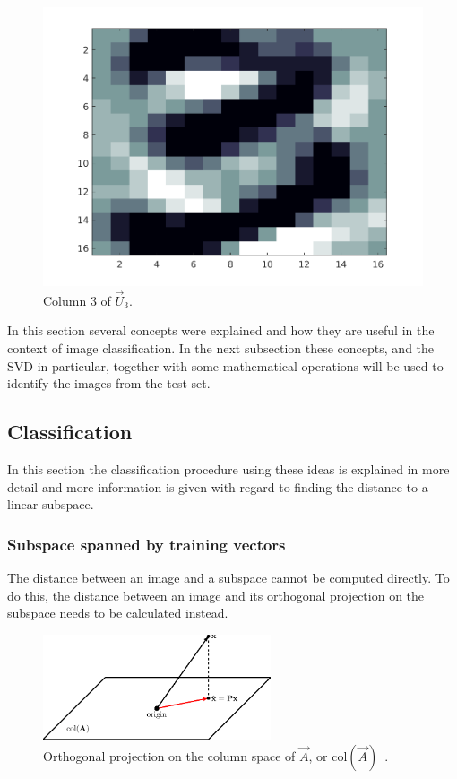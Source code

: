 \begin{figure}[H]
\begin{minipage}{0.3\textwidth}
        \includegraphics[width = \textwidth]{images/svd/U3.png}
        \caption{Column 3 of \(\vec{U}_3\).}\label{fig:svd_u3}
    \end{minipage}
\end{figure}

In this section several concepts were explained and how they are useful in the context of image classification.
In the next subsection these concepts, and the SVD in particular, together with some mathematical operations will be used to identify the images from the test set.

\subsection{Classification}
In this section the classification procedure using these ideas is explained in more detail and more information is given with regard to finding the distance to a linear subspace.

\subsubsection{Subspace spanned by training vectors}
The distance between an image and a subspace cannot be computed directly.
To do this, the distance between an image and its orthogonal projection on the subspace needs to be calculated instead.

\begin{figure}[H]
    \centering
    \includegraphics[width = 0.6\textwidth]{images/svd/orth_proj.png}
    \caption{Orthogonal projection on the column space of \(\vec{A}\), or col\((\vec{A})\)~\cite{Erichson2016}.}\label{fig:orth_proj}
\end{figure}

